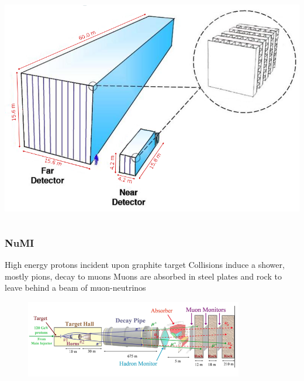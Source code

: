 \documentclass[10pt,professionalfonts,xcolor=table]{beamer}
\begin{document}
{\begin{columns}[c]
\vspace{7pt}

\includegraphics[width=1\textwidth]{figures/figures/detectors.png}

\end{columns}


}

\frame
{
  \frametitle{NuMI}
    \begin{itemize}
	\bang High energy protons incident upon graphite target
	\bang Collisions induce a shower, mostly pions, decay to muons
	\bang Muons are absorbed in steel plates and rock to leave behind a beam of muon-neutrinos
	\begin{figure} \includegraphics[width=0.85\textwidth]{figures/figures/numi.png} \end{figure}
\end{itemize}

}
\end{document}
